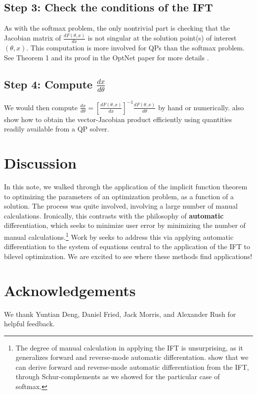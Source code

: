 \documentclass[11pt]{article}
\begin{document}
\subsection*{Step 3: Check the conditions of the IFT}
As with the softmax problem,
the only nontrivial part is checking that the Jacobian matrix of $\frac{dF(\theta,x)}{dx}$ is
not singular at the solution point(s) of interest $(\theta,x)$.
This computation is more involved for QPs than the softmax problem. 
See Theorem 1 and its proof in the OptNet paper for more details \citep{optnet}.

\subsection*{Step 4: Compute $\frac{dx}{d\theta}$}
We would then compute
$\frac{dx}{d\theta} = \left[\frac{dF(\theta,x)}{dx}\right]^{-1}\frac{dF(\theta,x)}{d\theta}$
by hand or numerically.
\citet{optnet} also show how to obtain the vector-Jacobian product efficiently
using quantities readily available from a QP solver.

\section{Discussion}
In this note, we walked through the application of the implicit function theorem
to optimizing the parameters of an optimization problem, as a function of a solution.
The process was quite involved, involving a large number of manual calculations.
Ironically, this contrasts with the philosophy of \textbf{automatic} differentiation,
which seeks to minimize user error by minimizing the number of manual calculations.\footnote{
The degree of manual calculation in applying the IFT is unsurprising,
as it generalizes forward and reverse-mode automatic differentation.
\citet{griewank2008autodiff} show that we can derive forward and reverse-mode automatic differentiation
from the IFT, through Schur-complements as we showed for the particular case of softmax.
}
Work by \citet{adift} seeks to address this via applying automatic differentiation to the
system of equations central to the application of the IFT to bilevel optimization.
We are excited to see where these methods find applications!

\section*{Acknowledgements}
We thank Yuntian Deng, Daniel Fried, Jack Morris, and Alexander Rush for helpful feedback.


\end{document}
